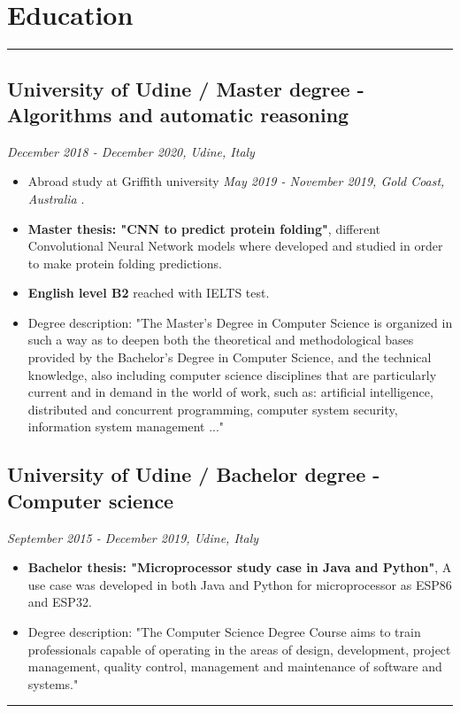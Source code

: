 \documentclass[a4paper,10pt]{article}
\begin{document}
\begin{minipage}[t]{0.25\textwidth}
        \section*{Education}
    \vspace{11.8cm} %
    \rule{0.6cm}{0.3mm}
\end{minipage}
\hfill
\begin{minipage}[t]{0.75\textwidth}
     \subsection*{University of Udine / Master degree - Algorithms and automatic reasoning }
    \textit{December 2018 - December 2020, Udine, Italy} \\
    \begin{itemize}[leftmargin=1cm]
        \item Abroad study at Griffith university \textit{May 2019 - November 2019, Gold Coast, Australia} .
        \item \textbf{Master thesis: "CNN to predict protein folding"}, different Convolutional Neural Network models where developed and studied in order to make protein folding predictions.
        \item \textbf{English level B2} reached with IELTS test. 
         \item Degree description: "The Master's Degree in Computer Science is organized in such a way as to deepen both the theoretical and methodological bases provided by the Bachelor's Degree in Computer Science, and the technical knowledge, also including computer science disciplines that are particularly current and in demand in the world of work, such as: artificial intelligence, distributed and concurrent programming, computer system security, information system management ..."
    \end{itemize}

    \subsection*{University of Udine / Bachelor degree - Computer science }
    \textit{September 2015 - December 2019, Udine, Italy} \\
        \begin{itemize}[leftmargin=1cm]
        \item \textbf{Bachelor thesis:   "Microprocessor study case in Java and Python"}, A use case was developed in both Java and Python for microprocessor as ESP86 and ESP32.
        \item Degree description: "The Computer Science Degree Course aims to train professionals capable of operating in the areas of design, development, project management, quality control, management and maintenance of software and systems."
    \end{itemize}
    \rule{\linewidth}{0.5mm}
\end{minipage}
\end{document}
